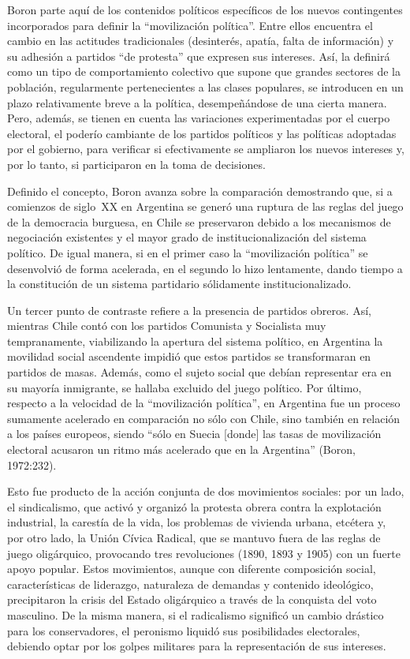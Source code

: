 Boron parte aquí de los contenidos políticos específicos de los nuevos contingentes incorporados para definir la \enquote{movilización política}. Entre ellos encuentra el cambio en las actitudes tradicionales (desinterés, apatía, falta de información) y su adhesión a partidos \enquote{de protesta} que expresen sus intereses. Así, la definirá como un tipo de comportamiento colectivo que supone que grandes sectores de la población, regularmente pertenecientes a las clases populares, se introducen en un plazo relativamente breve a la política, desempeñándose de una cierta manera. Pero, además, se tienen en cuenta las variaciones experimentadas por el cuerpo electoral, el poderío cambiante de los partidos políticos y las políticas adoptadas por el gobierno, para verificar si efectivamente se ampliaron los nuevos intereses y, por lo tanto, si participaron en la toma de decisiones.

Definido el concepto, Boron avanza sobre la comparación demostrando que, si a comienzos de siglo~XX en Argentina se generó una ruptura de las reglas del juego de la democracia burguesa, en Chile se preservaron debido a los mecanismos de negociación existentes y el mayor grado de institucionalización del sistema político. De igual manera, si en el primer caso la \enquote{movilización política} se desenvolvió de forma acelerada, en el segundo lo hizo lentamente, dando tiempo a la constitución de un sistema partidario sólidamente institucionalizado.

Un tercer punto de contraste refiere a la presencia de partidos obreros. Así, mientras Chile contó con los partidos Comunista y Socialista muy tempranamente, viabilizando la apertura del sistema político, en Argentina la movilidad social ascendente impidió que estos partidos se transformaran en partidos de masas. Además, como el sujeto social que debían representar era en su mayoría inmigrante, se hallaba excluido del juego político. Por último, respecto a la velocidad de la \enquote{movilización política}, en Argentina fue un proceso sumamente acelerado en comparación no sólo con Chile, sino también en relación a los países europeos, siendo \enquote{sólo en Suecia [donde] las tasas de movilización electoral acusaron un ritmo más acelerado que en la Argentina} (Boron, 1972:232).

Esto fue producto de la acción conjunta de dos movimientos sociales: por un lado, el sindicalismo, que activó y organizó la protesta obrera contra la explotación industrial, la carestía de la vida, los problemas de vivienda urbana, etcétera y, por otro lado, la Unión Cívica Radical, que se mantuvo fuera de las reglas de juego oligárquico, provocando tres revoluciones (1890, 1893 y 1905) con un fuerte apoyo popular. Estos movimientos, aunque con diferente composición social, características de liderazgo, naturaleza de demandas y contenido ideológico, precipitaron la crisis del Estado oligárquico a través de la conquista del voto masculino. De la misma manera, si el radicalismo significó un cambio drástico para los conservadores, el peronismo liquidó sus posibilidades electorales, debiendo optar por los golpes militares para la representación de sus intereses.

